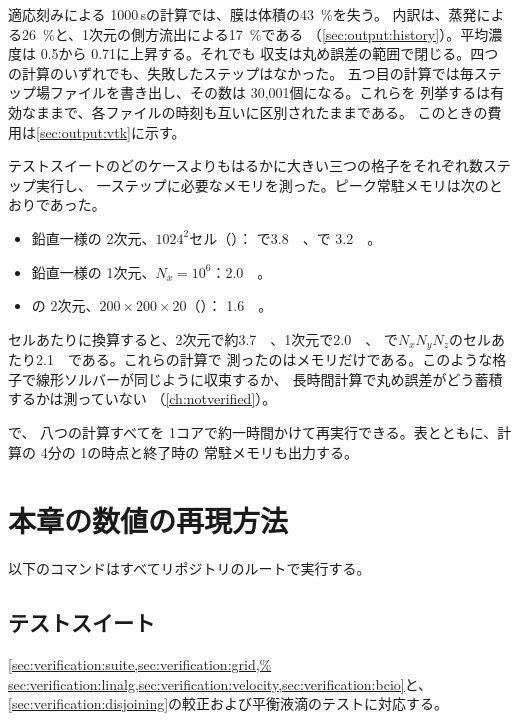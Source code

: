 適応刻みによる 1000\,sの計算では、膜は体積の\SI{43}{\percent}を失う。
内訳は、蒸発による\SI{26}{\percent}と、1次元の側方流出による\SI{17}{\percent}である
（\cref{sec:output:history}）。平均濃度は 0.5から 0.71に上昇する。それでも
収支は丸め誤差の範囲で閉じる。四つの計算のいずれでも、失敗したステップはなかった。
五つ目の計算では毎ステップ場ファイルを書き出し、その数は 30{,}001個になる。これらを
列挙するは有効なままで、各ファイルの時刻も互いに区別されたままである。
このときの費用は\cref{sec:output:vtk}に示す。

テストスイートのどのケースよりもはるかに大きい三つの格子をそれぞれ数ステップ実行し、
一ステップに必要なメモリを測った。ピーク常駐メモリは次のとおりであった。
\begin{itemize}
  \item 鉛直一様の 2次元、$1024^{2}$セル（）：
    で\SI{3.8}{\giga\byte}、で
    \SI{3.2}{\giga\byte}。
  \item 鉛直一様の 1次元、$N_x = 10^{6}$：\SI{2.0}{\giga\byte}。
  \item {}の 2次元、$200 \times 200 \times 20$（）：
    \SI{1.6}{\giga\byte}。
\end{itemize}
セルあたりに換算すると、2次元で約\SI{3.7}{\kilo\byte}、1次元で\SI{2.0}{\kilo\byte}、
で$N_x N_y N_z$のセルあたり\SI{2.1}{\kilo\byte}である。これらの計算で
測ったのはメモリだけである。このような格子で線形ソルバーが同じように収束するか、
長時間計算で丸め誤差がどう蓄積するかは測っていない
（\cref{ch:notverified}）。

で、
八つの計算すべてを 1コアで約一時間かけて再実行できる。表とともに、計算の 4分の 1の時点と終了時の
常駐メモリも出力する。

\section{本章の数値の再現方法}
\label{sec:verification:reproduce}

以下のコマンドはすべてリポジトリのルートで実行する。

\subsection{テストスイート}

\cref{sec:verification:suite,sec:verification:grid,%
sec:verification:linalg,sec:verification:velocity,sec:verification:bcio}と、
\cref{sec:verification:disjoining}の較正および平衡液滴のテストに対応する。

